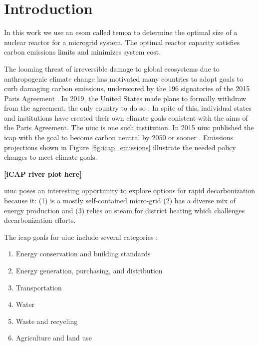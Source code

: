 \section{Introduction}

In this work we use an \gls{esom} called \gls{temoa} to determine the optimal
size of a nuclear reactor for a microgrid system. The optimal reactor capacity
satisfies carbon emissions limits and minimizes system cost.


The looming threat of irreversible damage to global ecosystems due to
anthropogenic climate change has motivated many countries to adopt goals to
curb damaging carbon emissions, underscored by the 196 signatories of the 2015
Paris Agreement \cite{noauthor_paris_nodate}. In 2019, the United States made
plans to formally withdraw from the agreement, the only country to do so
\cite{eshraghi_us_2018}. In spite of
this, individual states and institutions have created their own climate goals
conistent with the aims of the Paris Agreement. The \gls{uiuc} is one such
institution. In 2015 \gls{uiuc} published the \gls{icap} with the goal to
become carbon neutral by 2050 or sooner \cite{isee_illinois_2015}. Emissions
projections shown in Figure \ref{fig:icap_emissions} illustrate the needed
policy changes to meet climate goals.


\textbf{[iCAP river plot here]} 

\gls{uiuc} poses an interesting opportunity to explore options for rapid
decarbonization because it: (1) is a mostly self-contained micro-grid (2) has a
diverse mix of energy production and (3) relies on steam for district heating
which challenges decarbonization efforts.


The \gls{icap} goals for \gls{uiuc} include several categories
\cite{isee_illinois_2015}:
\begin{enumerate}
  \item Energy conservation and building standards
  \item Energy generation, purchasing, and distribution
  \item Transportation
  \item Water
  \item Waste and recycling
  \item Agriculture and land use
\end{enumerate}

